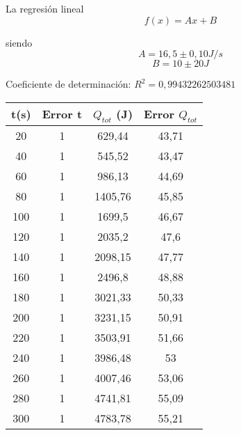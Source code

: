 \documentclass[a4paper,12pt,spanish]{article}
\begin{document}
	
	

La regresión lineal
\[f(x) = Ax + B
\]

siendo 
\[ A = 16,5 \pm 0,10 \si{J/s}
\]
\[B = 10 \pm 20 \si{J}
\]

Coeficiente de determinación: $R^2 = 0,99432262503481$






\begin{table}[H]
	\centering
	\begin{tabular}{|c|c|c|c|}
		\hline
		t(s) & Error t & $Q_{tot}$ (J)     & Error $Q_{tot}$ \\ \hline\hline
		20   & 1       & 629,44 & 43,71           \\ \hline
		40   & 1       & 545,52            & 43,47           \\ \hline
		60   & 1       & 986,13            & 44,69           \\ \hline
		80   & 1       & 1405,76           & 45,85           \\ \hline
		100  & 1       & 1699,5            & 46,67           \\ \hline
		120  & 1       & 2035,2            & 47,6            \\ \hline
		140  & 1       & 2098,15           & 47,77           \\ \hline
		160  & 1       & 2496,8            & 48,88           \\ \hline
		180  & 1       & 3021,33           & 50,33           \\ \hline
		200  & 1       & 3231,15           & 50,91           \\ \hline
		220  & 1       & 3503,91           & 51,66           \\ \hline
		240  & 1       & 3986,48           & 53              \\ \hline
		260  & 1       & 4007,46           & 53,06           \\ \hline
		280  & 1       & 4741,81           & 55,09           \\ \hline
		300  & 1       & 4783,78           & 55,21           \\ \hline

\end{tabular}
\end{table}
\end{document}
